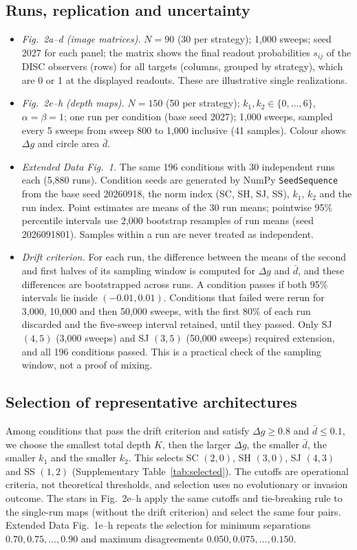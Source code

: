 \documentclass[fleqn,10pt]{article}
\theoremstyle{plain}
\theoremstyle{remark}
\newcommand{\FigRecognition}{2}
\newcommand{\EDRecognition}{1}
\begin{document}
\subsection{Runs, replication and uncertainty}
\begin{itemize}
\item \emph{Fig.~\FigRecognition a--d (image matrices).} $N=90$ (30 per strategy);
1,000 sweeps; seed 2027 for each panel; the matrix shows the final readout
probabilities $s_{ij}$ of the DISC observers (rows) for all targets (columns,
grouped by strategy), which are 0 or 1 at the displayed readouts. These are
illustrative single realizations.
\item \emph{Fig.~\FigRecognition e--h (depth maps).} $N=150$ (50 per strategy);
$k_1,k_2\in\{0,\dots,6\}$, $\alpha=\beta=1$; one run per condition (base seed 2027);
1,000 sweeps, sampled every 5 sweeps from sweep 800 to 1,000 inclusive (41
samples). Colour shows $\Delta g$ and circle area $\bar d$.
\item \emph{Extended Data Fig.~\EDRecognition.} The same 196 conditions with 30
independent runs each (5,880 runs). Condition seeds are generated by NumPy
\texttt{SeedSequence} from the base seed 20260918, the norm index (SC, SH, SJ,
SS), $k_1$, $k_2$ and the run index. Point estimates are means of the 30 run
means; pointwise 95\% percentile intervals use 2,000 bootstrap resamples of run
means (seed 2026091801). Samples within a run are never treated as independent.
\item \emph{Drift criterion.} For each run, the difference between the means of
the second and first halves of its sampling window is computed for $\Delta g$
and $\bar d$, and these differences are bootstrapped across runs. A condition
passes if both 95\% intervals lie inside $(-0.01,0.01)$. Conditions that failed
were rerun for 3,000, 10,000 and then 50,000 sweeps, with the first 80\% of each
run discarded and the five-sweep interval retained, until they passed. Only SJ
$(4,5)$ (3,000 sweeps) and SJ $(3,5)$ (50,000 sweeps) required extension, and
all 196 conditions passed. This is a practical check of the sampling window,
not a proof of mixing.
\end{itemize}

\subsection{Selection of representative architectures}
Among conditions that pass the drift criterion and satisfy $\Delta g\ge0.8$ and
$\bar d\le0.1$, we choose the smallest total depth $K$, then the larger
$\Delta g$, the smaller $\bar d$, the smaller $k_1$ and the smaller $k_2$. This
selects SC $(2,0)$, SH $(3,0)$, SJ $(4,3)$ and SS $(1,2)$
(Supplementary Table~\ref{tab:selected}). The cutoffs are operational criteria,
not theoretical thresholds, and selection uses no evolutionary or invasion
outcome. The stars in Fig.~\FigRecognition e--h apply the same cutoffs and
tie-breaking rule to the single-run maps (without the drift criterion) and
select the same four pairs. Extended Data Fig.~\EDRecognition e--h repeats the
selection for minimum separations $0.70,0.75,\dots,0.90$ and maximum
disagreements $0.050,0.075,\dots,0.150$.
\end{document}
